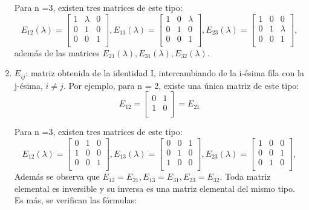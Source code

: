 \documentclass[b5paper, 11pt]{book}
\newcommand{\0}{\mathbf{0}}
\theoremstyle{estiloB}
\theoremstyle{estiloC}
\theoremstyle{estiloD}
\theoremstyle{estiloE}
\begin{document}
\begin{enumerate}
Para n =3, existen tres matrices de este tipo:
\begin{equation*}
 E_{12}(\lambda) = \begin{bmatrix}
 1 & \lambda &  0 \\
 0 &  1 & 0 \\
 0 &  0 & 1 \\
\end{bmatrix},
 E_{13}(\lambda) = \begin{bmatrix}
 1 &  0 & \lambda \\
 0 &  1 & 0 \\
 0 &  0 & 1 \\
\end{bmatrix},
 E_{23}(\lambda) = \begin{bmatrix}
 1 &  0 & 0 \\
 0 &  1 & \lambda \\
 0 &  0 & 1  \\ 
\end{bmatrix} , 
\end{equation*}
adem\'{a}s de las matrices $E_{21}(\lambda), E_{31}(\lambda), E_{32}(\lambda)$.

\item $E_{ij}$: matriz obtenida de la identidad I, intercambiando de la i-\'{e}sima fila con la j-\'{e}sima, $ i\not= j$. Por ejemplo, para n = 2, existe una \'{u}nica matriz de este tipo: 
\begin{equation*}
E_{12} = \begin{bmatrix}
 0 &  1 \\
 1 &  0 \\
\end{bmatrix}
= E_{21}
\end{equation*}

Para n =3, existen tres matrices de este tipo:
\begin{equation*}
 E_{12}(\lambda) = \begin{bmatrix}
 0 &  1 & 0 \\
 1 &  0 & 0 \\
 0 &  0 & 1 \\
\end{bmatrix},
 E_{13}(\lambda) = \begin{bmatrix}
 0 &  0 & 1 \\
 0 &  1 & 0 \\
 1 &  0 & 0 \\
\end{bmatrix},
 E_{23}(\lambda) = \begin{bmatrix}
 1 &  0 & 0 \\
 0 &  0 & 1 \\
 0 &  1 & 0 \\ 
\end{bmatrix} , 
\end{equation*}
Adem\'{a}s se observa que $E_{12}= E_{21},E_{13}= E_{31},E_{23}= E_{32}$. Toda matriz elemental es inversible y su inversa es una matriz elemental del mismo tipo. Es m\'{a}s, se verifican las f\'{o}rmulas:


\end{enumerate}
\end{document}
